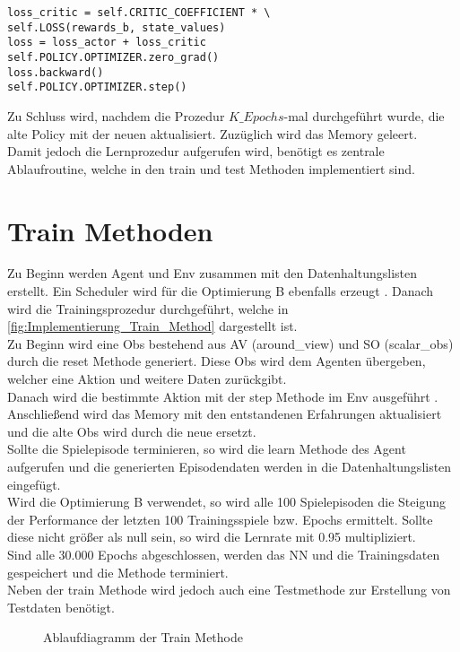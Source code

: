 \begin{lstlisting}[caption=Bestimmung des PPO-Losses und Update der Netze, label=code:Bestimmung_PPO_Losses_update_NN, style=Python]
loss_critic = self.CRITIC_COEFFICIENT * \ 
self.LOSS(rewards_b, state_values)
loss = loss_actor + loss_critic 
self.POLICY.OPTIMIZER.zero_grad()
loss.backward()
self.POLICY.OPTIMIZER.step()
\end{lstlisting}
Zu Schluss wird, nachdem die Prozedur $K\_Epochs$-mal durchgeführt wurde, die alte Policy mit der neuen aktualisiert. Zuzüglich wird das Memory geleert.\\
Damit jedoch die Lernprozedur aufgerufen wird, benötigt es zentrale Ablaufroutine, welche in den train und test Methoden implementiert sind.

\section{Train Methoden} \label{sec:Implementierung_train_Methode}
Zu Beginn werden Agent und Env zusammen mit den Datenhaltungslisten  erstellt. Ein Scheduler wird für die Optimierung B ebenfalls erzeugt . Danach wird die Trainingsprozedur durchgeführt, welche in \autoref{fig:Implementierung_Train_Method} dargestellt ist.\\
Zu Beginn wird eine Obs bestehend aus AV (around\_view) und SO (scalar\_obs) durch die reset Methode \fullref{subsec:Konzept_Schnittstelle} generiert. 
Diese Obs wird dem Agenten übergeben, welcher eine Aktion und weitere Daten zurückgibt.\\
Danach wird die bestimmte Aktion mit der step Methode im Env ausgeführt .
Anschließend wird das Memory mit den entstandenen Erfahrungen aktualisiert und die alte Obs wird durch die neue ersetzt.\\
Sollte die Spielepisode terminieren, so wird die learn Methode des Agent aufgerufen und die generierten Episodendaten werden in die Datenhaltungslisten eingefügt.\\
Wird die Optimierung B verwendet, so wird alle 100 Spielepisoden die Steigung der Performance der letzten 100 Trainingsspiele bzw. Epochs ermittelt. Sollte diese nicht größer als null sein, so wird die Lernrate mit 0.95 multipliziert.\\
Sind alle 30.000 Epochs abgeschlossen, werden das NN und die Trainingsdaten gespeichert und die Methode terminiert.\\
Neben der train Methode wird jedoch auch eine Testmethode zur Erstellung von Testdaten benötigt.
\begin{figure}[H]
	\centering
	
	\caption[Ablaufdiagramm der train Methode]{Ablaufdiagramm der Train Methode}
	\label{fig:Implementierung_Train_Method}
\end{figure}


